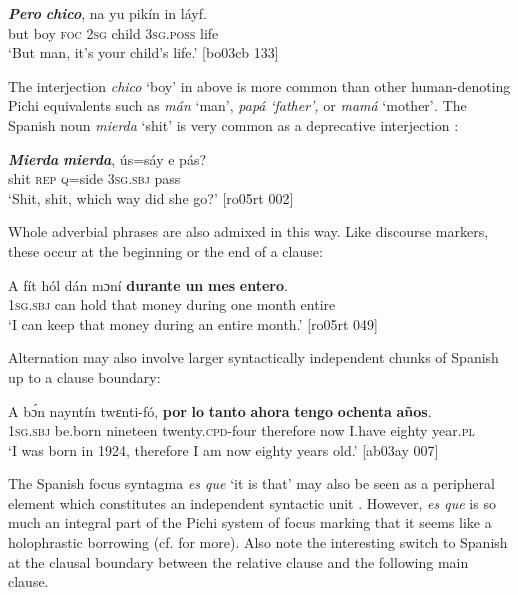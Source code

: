 \ea%
    \label{ex:key:1736}
    \gll \textbf{\textit{Pero}  }  \textbf{\textit{chico}},  na  yu  pikín  in    láyf.\\
but    boy    \textsc{foc}  \textsc{2sg}  child  \textsc{3sg.poss}  life\\
\glt ‘But man, it’s your child’s life.’ [bo03cb 133]
\z

The interjection \textit{chico} ‘boy’ in  above is more common than other human-denoting Pichi equivalents such as \textit{mán} ‘man’,\textit{ papá} \textit{\textup{‘father’,} }or \textit{mamá} ‘mother’\textit{.} The Spanish noun \textit{mierda} ‘shit’\textit{} is very common as a deprecative interjection :


\ea%
    \label{ex:key:1737}
    \gll \textbf{\textit{Mierda}}  \textbf{\textit{mierda}},  ús=sáy  e    pás?\\
shit    \textsc{rep}    \textsc{q}=side  \textsc{3sg.sbj}  pass  \\

\glt ‘Shit, shit, which way did she go?’ [ro05rt 002]
\z

Whole adverbial phrases are also admixed in this way. Like discourse markers, these occur at the beginning or the end of a clause: 


\ea%
    \label{ex:key:1738}
    \gll A    fít  hól  dán  mɔní  \textbf{durante}  \textbf{un}  \textbf{mes}    \textbf{entero}.\\
\textsc{1sg.sbj}  can  hold  that  money  during  one  month  entire\\

\glt ‘I can keep that money during an entire month.’ [ro05rt 049]
\z

Alternation may also involve larger syntactically independent chunks of Spanish up to a clause boundary: 


\ea%
    \label{ex:key:1739}
    \gll A    bɔ́n    nayntín    twɛnti-fó,    {\textbf{por} \textbf{lo} \textbf{tanto}}
\textbf{ahora}  \textbf{tengo}  \textbf{ochenta}  \textbf{años}.\\
\textsc{1sg.sbj}  be.born  nineteen    twenty.\textsc{cpd}{}-four  therefore
now    I.have  eighty  year.\textsc{pl}\\

\glt ‘I was born in 1924, therefore I am now eighty years old.’ [ab03ay 007]
\z

The Spanish focus syntagma \textit{es que} ‘it is that’ may also be seen as a peripheral element which constitutes an independent syntactic unit . However, \textit{es que} is so much an integral part of the Pichi system of focus marking that it seems like a holophrastic borrowing (cf.  for more). Also note the interesting switch to Spanish at the clausal boundary between the relative clause and the following main clause.


